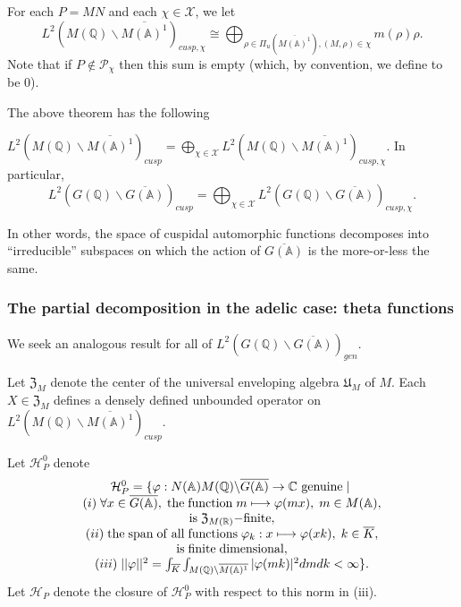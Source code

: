 For each $P=MN$ and each $\chi \in {\mathcal X}$, we let 
\begin{equation}\label{eq:5.2}
L^2(M({{\mathbb{Q}}})\backslash \overline{M({\mathbb{A}})^1})_{cusp,\chi }
\cong
\bigoplus_{\rho \in \Pi _u(\overline{M({\mathbb{A}})^1}) ,
(M,\rho )\in \chi }
m(\rho )\rho .
\end{equation}
Note that if $P\notin {\mathcal P}_\chi $ then this sum is empty (which, by
convention, we define to be $0$).

The above theorem has the following

\begin{corollary}\label{cor:5.5}
$L^2(M({\mathbb{Q}})\backslash \overline{M({\mathbb{A}})^1})_{cusp}
=\bigoplus_{\chi \in {\mathcal X}}
L^2(M({\mathbb{Q}})\backslash \overline{M({\mathbb{A}})^1})_{cusp,\chi }$.
In particular, 
\[
L^2(G({\mathbb{Q}})\backslash \overline{G({\mathbb{A}})})_{cusp}
=\bigoplus_{\chi \in {\mathcal X}}
L^2(G({\mathbb{Q}})\backslash \overline{G({\mathbb{A}})})_{cusp,\chi }.
\]
\end{corollary}

In other words, the space of cuspidal automorphic functions decomposes into
``irreducible'' subspaces on which the action of $\overline{G({\mathbb{A}})}$ is the
more-or-less the same.

\subsubsection{The partial decomposition in the adelic case: theta functions}

We seek an analogous result for all of
$L^2(G({\mathbb{Q}})\backslash \overline{G({\mathbb{A}})})_{gen}$.

Let ${\mathfrak{Z}}_M$ denote the center of the
universal enveloping algebra ${\mathfrak{U}}_M$ of $M$. Each
$X\in {\mathfrak{Z}}_M$ defines a densely defined
unbounded operator on
$L^2(M({\mathbb{Q}})\backslash \overline{M({\mathbb{A}})^1})_{cusp}$.

Let ${\mathcal H}_P^0$ denote 
\begin{equation}\label{eq:5.3}
\begin{array}{c}
{\mathcal H}_P^0
=\{\varphi :N({\mathbb{A}})M({\mathbb{Q}})
\backslash \overline{G({\mathbb{A}})}\rightarrow {\mathbb{C}}
\ {\rm genuine}\;|\; \\ 
(i)\;\forall x\in \overline{G({\mathbb{A}})},
\;{\rm the\;function}\;m\longmapsto \varphi (mx),
\;m\in M({\mathbb{A}}), \\ 
{\rm is}\;{\mathfrak{Z}}_{M({\mathbb{R}})}{\rm -finite}, \\ 
(ii)\;{\rm the\;span\;of\;all\;functions}
\;\varphi _k:x\longmapsto \varphi (xk),\;k\in \overline{K}, \\ 
{\rm is\;finite\;}{\rm dimensional}, \\ 
(iii)\;||\varphi ||^2=
\int_{\overline{K}}
\int_{M({\mathbb{Q}})\backslash \overline{M({\mathbb{A}})^1}}
|\varphi (mk)|^2dmdk<\infty \} .
\end{array}
\end{equation}
Let ${\mathcal H}_P$ denote the closure of ${\mathcal H}_P^0$ with respect to this
norm in (iii).

